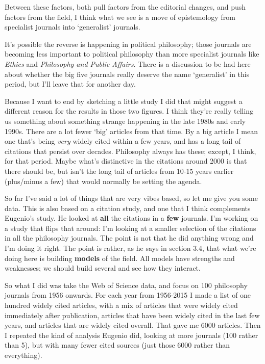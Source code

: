 \documentclass[
  11pt,
  letterpaper,
  DIV=11,
  numbers=noendperiod,
  twoside]{scrartcl}
\begin{document}
Between these factors, both pull factors from the editorial changes, and
push factors from the field, I think what we see is a move of
epistemology from specialist journals into `generalist' journals.

It's possible the reverse is happening in political philosophy; those
journals are becoming less important to political philosophy than more
specialist journals like \emph{Ethics} and \emph{Philosophy and Public
Affairs}. There is a discussion to be had here about whether the big
five journals really deserve the name `generalist' in this period, but
I'll leave that for another day.

Because I want to end by sketching a little study I did that might
suggest a different reason for the results in those two figures. I think
they're really telling us something about something strange happening in
the late 1980s and early 1990s. There are a lot fewer `big' articles
from that time. By a big article I mean one that's being \emph{very}
widely cited within a few years, and has a long tail of citations that
persist over decades. Philosophy always has these; except, I think, for
that period. Maybe what's distinctive in the citations around 2000 is
that there should be, but isn't the long tail of articles from 10-15
years earlier (plus/minus a few) that would normally be setting the
agenda.

So far I've said a lot of things that are very vibes based, so let me
give you some data. This is also based on a citation study, and one that
I think complements Eugenio's study. He looked at \textbf{all} the
citations in a \textbf{few} journals. I'm working on a study that flips
that around: I'm looking at a smaller selection of the citations in all
the philosophy journals. The point is not that he did anything wrong and
I'm doing it right. The point is rather, as he says in section 3.4, that
what we're doing here is building \textbf{models} of the field. All
models have strengths and weaknesses; we should build several and see
how they interact.

So what I did was take the Web of Science data, and focus on 100
philosophy journals from 1956 onwards. For each year from 1956-2015 I
made a list of one hundred widely cited articles, with a mix of articles
that were widely cited immediately after publication, articles that have
been widely cited in the last few years, and articles that are widely
cited overall. That gave me 6000 articles. Then I repeated the kind of
analysis Eugenio did, looking at more journals (100 rather than 5), but
with many fewer cited sources (just those 6000 rather than everything).
\end{document}
